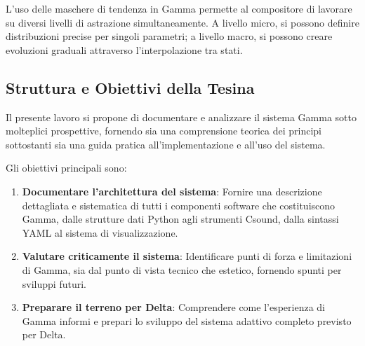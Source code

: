 L'uso delle maschere di tendenza in Gamma permette al compositore di lavorare su diversi livelli di astrazione simultaneamente. A livello micro, si possono definire distribuzioni precise per singoli parametri; a livello macro, si possono creare evoluzioni graduali attraverso l'interpolazione tra stati.
\subsection{Struttura e Obiettivi della Tesina}
Il presente lavoro si propone di documentare e analizzare il sistema Gamma sotto molteplici prospettive, fornendo sia una comprensione teorica dei principi sottostanti sia una guida pratica all'implementazione e all'uso del sistema.

Gli obiettivi principali sono:

\begin{enumerate}
    \item \textbf{Documentare l'architettura del sistema}: Fornire una descrizione dettagliata e sistematica di tutti i componenti software che costituiscono Gamma, dalle strutture dati Python agli strumenti Csound, dalla sintassi YAML al sistema di visualizzazione.
    \item \textbf{Valutare criticamente il sistema}: Identificare punti di forza e limitazioni di Gamma, sia dal punto di vista tecnico che estetico, fornendo spunti per sviluppi futuri.
    \item \textbf{Preparare il terreno per Delta}: Comprendere come l'esperienza di Gamma informi e prepari lo sviluppo del sistema adattivo completo previsto per Delta.
\end{enumerate}